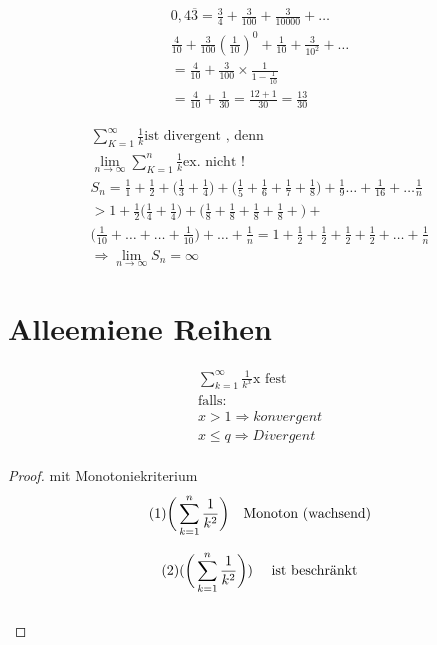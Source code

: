 \begin{example}
\begin{equation}
\begin{aligned}
0,4 \overline{3} = \frac{3}{4} + \frac{3}{100} + \frac{3}{10000}+ \dots \\
\frac{4}{10} + \frac{3}{100}(\frac{1}{10})^0 + \frac{1}{10} + \frac{3}{10^2} + \dots \\
=\frac{4}{10} + \frac{3}{100} \times \frac{1}{1-\frac{1}{10}}\\
= \frac{4}{10}+ \frac{1}{30} = \frac{12+1}{30}= \frac{13}{30}
\end{aligned}
\end{equation}
\end{example}

\begin{example}
\begin{equation}
\begin{aligned}
\sum_{K=1}^\infty{\frac{1}{k}} \text{ist divergent , denn }\\
\lim_{n \to \infty} \sum_{K=1}^n{\frac{1}{k}} \text{ex. nicht ! }\\
S_n = \frac{1}{1} + \frac{1}{2} + \big(\frac{1}{3} + \frac{1}{4} \big)+
\big(\frac{1}{5} + \frac{1}{6} + \frac{1}{7} + \frac{1}{8} \big) 
+ \frac{1}{9} \dots + \frac{1}{16} + \dots \frac{1}{n} \\
 > 1 + \frac{1}{2} \big(\frac{1}{4} + \frac{1}{4} \big) + 
 \big(\frac{1}{8}+ \frac{1}{8}+ \frac{1}{8}+ \frac{1}{8}+ \big)+ \\
 \big( \frac{1}{10} + \dots + \dots + \frac{1}{10} \big)+ \dots + \frac{1}{n}= 1+ \frac{1}{2} + \frac{1}{2} + \frac{1}{2} + \frac{1}{2}+ \dots + \frac{1}{n}\\
 \Rightarrow \lim_{n \to \infty}S_n=\infty
\end{aligned}
\end{equation}
\end{example}

\section{Alleemiene Reihen}
\begin{lemma}
\begin{equation}
\begin{aligned}
\sum_{k=1}^\infty {\frac{1}{k^x}} \text{x fest}\\
\text{falls:}\\
x > 1 \Rightarrow konvergent\\
x \leq q \Rightarrow Divergent\\
\end{aligned}
\end{equation}
\end{lemma}


\begin{proof}{mit Monotoniekriterium}
\begin{equation}
(1)\bigg(\sum_{k=1}^n {\frac{1}{k^2}} \bigg) \text{\quad Monoton (wachsend)} 
\end{equation}

\begin{equation}
(2)(\bigg(\sum_{k=1}^n {\frac{1}{k^2}} \bigg)) \text{ \quad ist beschränkt}
\end{equation}  \\




\end{proof}

